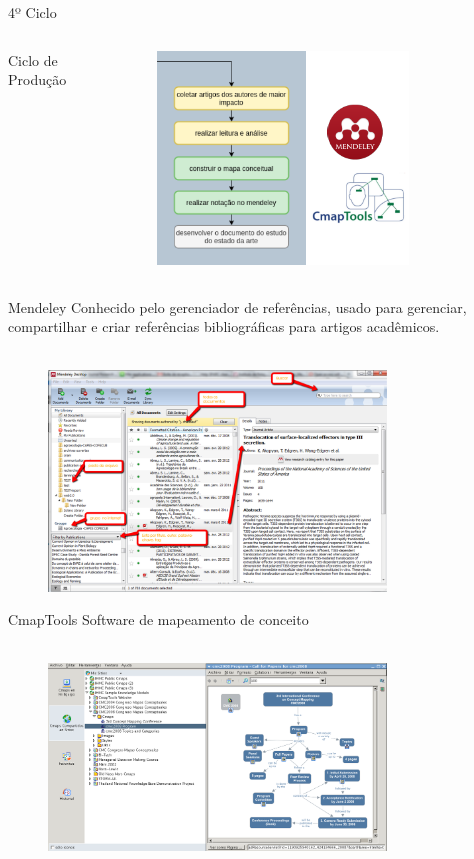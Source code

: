 \begin{frame}{4º Ciclo}
	\begin{columns}
        Ciclo de Produção
		\begin{figure}[hb]
      \includegraphics[width=0.8\textwidth]{figures/ciclo4.png}
		\end{figure}
	\end{columns}
\end{frame}

\begin{frame}{Mendeley}
	Conhecido pelo gerenciador de referências, usado para gerenciar, compartilhar e criar referências bibliográficas para artigos acadêmicos.
	\\~\\
	\begin{figure}[hb]
		\includegraphics[width=0.8\textwidth]{figures/mendeley.png}
	\end{figure}
\end{frame}

\begin{frame}{CmapTools}
	Software de mapeamento de conceito
	\\~\\
	\begin{figure}[hb]
		\includegraphics[width=0.8\textwidth]{figures/cmaptools.png}
	\end{figure}
\end{frame}